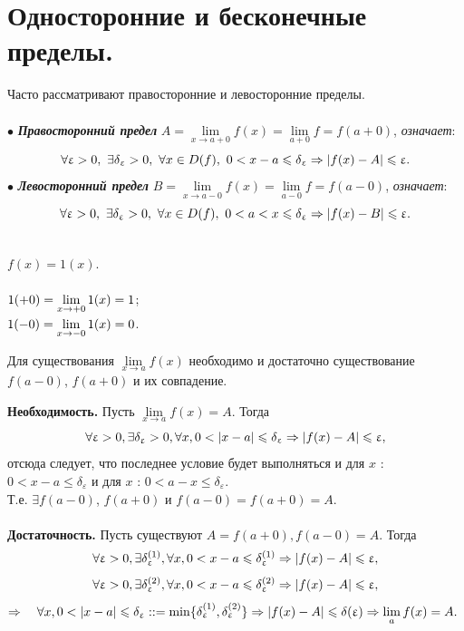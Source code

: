 \section{Односторонние и бесконечные пределы.}
Часто рассматривают правосторонние и левосторонние пределы.\\\\ 
$\bullet$ \textit{\textbf{Правосторонний предел}} $A=\lim\limits_{x\to a+0}f(x) = \lim\limits_{a+0}f=f(a+0)$, \textit{означает}: $$\forall\varepsilon>0,\ \exists\delta_\varepsilon>0,\ \forall x\in D(f),\ 0<x-a\leqslant\delta_\varepsilon\Ra|f(x)-A|\leqslant\varepsilon.$$
$\bullet$ \textit{\textbf{Левосторонний предел}} $B=\lim\limits_{x\to a-0}f(x)=\lim\limits_{a-0}f=f(a-0)$, \textit{означает}: $$\forall\varepsilon>0,\ \exists\delta_\varepsilon>0,\ \forall x\in D(f),\ 0 < a < x\leqslant\delta_\varepsilon\Ra|f(x)-B|\leqslant\varepsilon.$$
\begin{example}
	\\$f(x) = 1(x)$.\\\\
	$1(+0)=\lim\limits_{x\rightarrow +0}1(x)=1$;\\
	$1(-0)=\lim\limits_{x\rightarrow -0}1(x)=0$.
\end{example}
\begin{lemma}
	Для существования $\lim\limits_{x\to a}f(x)$ необходимо и достаточно существование $f(a-0)$, $f(a+0)$ и их совпадение.
\end{lemma}
\begin{Proof}
	\textbf{Необходимость.}
	Пусть $\lim\limits_{x\to a}f(x)=A$. Тогда
	$$\forall\varepsilon>0,\exists\delta_\varepsilon>0,\forall x, 0<|x-a|\leqslant\delta_\varepsilon\Ra|f(x)-A|\leqslant\varepsilon,$$
	отсюда следует, что последнее условие будет выполняться и для $x$ : $0<x-a\leqslant\delta_\varepsilon$ и для $x$ : $0<a-x\leqslant\delta_\varepsilon$. \\Т.е. $\exists f(a-0)$, $f(a+0)$ и $f(a-0) = f(a+0)=A$.\\\\
	\textbf{Достаточность.}
	Пусть существуют $A=f(a+0), f(a-0)=A$. Тогда
	$$\forall\upvarepsilon>0,\exists\delta_\upvarepsilon^{(1)},\forall x, 0 < x - a \leqslant \delta_\upvarepsilon^{(1)}\Rightarrow |f(x)-A|\leqslant\upvarepsilon,$$
	$$\forall\upvarepsilon>0,\exists\delta_\upvarepsilon^{(2)},\forall x, 0 < x - a \leqslant \delta_\upvarepsilon^{(2)}\Rightarrow |f(x)-A|\leqslant\upvarepsilon,$$
	$\Ra\quad\forall x, 0<|x-a|\leqslant\delta_\varepsilon::=\min\{\delta_\varepsilon^{(1)},\delta_\varepsilon^{(2)}\}\Ra|f(x)-A|\leqslant\delta(\varepsilon)\Ra\lim\limits_a f(x)=A.$
\end{Proof}\\\\
